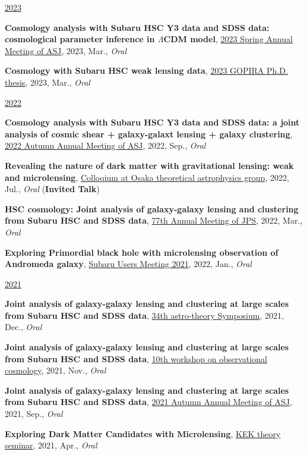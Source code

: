 \underline{2023}
\begin{etaremune}
\setcounter{enumi}{26}
\item \textbf{Cosmology analysis with Subaru HSC Y3 data and SDSS data: cosmological parameter inference in $\Lambda$CDM model}, \href{https://www.asj.or.jp/nenkai/archive/2023a/pdf/U20a.pdf}{2023 Spring Annual Meeting of ASJ}, 2023, Mar., \textit{Oral}
\item \textbf{Cosmology with Subaru HSC weak lensing data}, \href{http://gopira.jp/Dthesis2022/program.html}{2023 GOPIRA Ph.D. thesis}, 2023, Mar., \textit{Oral}
\end{etaremune}

\underline{2022}
\begin{etaremune}
\setcounter{enumi}{24}
\item \textbf{Cosmology analysis with Subaru HSC Y3 data and SDSS data: a joint analysis of cosmic shear + galaxy-galaxt lensing + galaxy clustering}, \href{https://www.asj.or.jp/nenkai/archive/2022b/pdf/U15a.pdf}{2022 Autumn Annual Meeting of ASJ}, 2022, Sep., \textit{Oral}
\item \textbf{Revealing the nature of dark matter with gravitational lensing: weak and microlensing}, \href{http://astro-osaka.jp/OUTAP/colloquium-abstracts.html#sugiyama}{Colloqium at Osaka theoretical astrophysics group}, 2022, Jul., \textit{Oral} (\textbf{Invited Talk})
\item \textbf{HSC cosmology: Joint analysis of galaxy-galaxy lensing and clustering from Subaru HSC and SDSS data}, \href{https://www.jps.or.jp/activities/meetings/annual/annual-index.php}{77th Annual Meeting of JPS}, 2022, Mar., \textit{Oral}
\item \textbf{Exploring Primordial black hole with microlensing observation of Andromeda galaxy}, \href{https://subarutelescope.org/Science/SubaruUM/SubaruUM2021/}{Subaru Users Meeting 2021}, 2022, Jan., \textit{Oral}
\end{etaremune}

\underline{2021}
\begin{etaremune}
\setcounter{enumi}{20}
\item \textbf{Joint analysis of galaxy-galaxy lensing and clustering at large scales from Subaru HSC and SDSS data}, \href{https://sites.google.com/view/rironkon2021/}{34th astro-theory Symposium}, 2021, Dec., \textit{Oral}
\item \textbf{Joint analysis of galaxy-galaxy lensing and clustering at large scales from Subaru HSC and SDSS data}, \href{https://sites.google.com/view/obscosmws2021main}{10th workshop on observational cosmology}, 2021, Nov., \textit{Oral}
\item \textbf{Joint analysis of galaxy-galaxy lensing and clustering at large scales from Subaru HSC and SDSS data}, \href{https://www.asj.or.jp/nenkai/archive/2021b/pdf/U05a.pdf}{2021 Autumn Annual Meeting of ASJ}, 2021, Sep., \textit{Oral}
\item \textbf{Exploring Dark Matter Candidates with Microlensing}, \href{https://www.kek.jp/ja/conference/20210407-3/}{KEK theory seminar}, 2021, Apr., \textit{Oral}
\end{etaremune}


